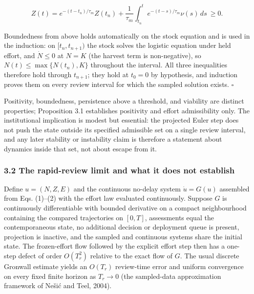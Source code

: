 \documentclass[11pt]{article}
\begin{document}
\[
Z(t)=e^{-(t-t_n)/\tau_m}Z(t_n)+\frac{1}{\tau_m}\int_{t_n}^{t}e^{-(t-s)/\tau_m}\nu(s)\,ds\ \ge 0 .
\]

Boundedness from above holds automatically on the stock equation and is used
in the induction: on \([t_n, t_{n+1})\) the stock solves the
logistic equation under held effort, and \(\dot N \le 0\) at \(N = K\)
(the harvest term is non-negative), so \(N(t) \le \max\{N(t_n), K\}\)
throughout the interval. All three inequalities therefore hold through
\(t_{n+1}\); they hold at \(t_0=0\) by hypothesis, and induction proves
them on every review interval for which the sampled solution exists. \ensuremath{\square}

Positivity, boundedness, persistence above a threshold, and viability
are distinct properties; Proposition 3.1 establishes positivity and
effort admissibility only. The institutional implication is modest but
essential: the projected Euler step does not push the state outside
its specified admissible set on a single review interval, and any later
stability or instability claim is therefore a statement about dynamics
inside that set, not about escape from it.

\subsubsection{3.2 The rapid-review limit and what it does not
establish}\label{the-rapid-review-limit-and-what-it-does-not-establish}

Define \(u=(N,Z,E)\) and the continuous no-delay system \(\dot u=G(u)\)
assembled from Eqs. (1)--(2) with the effort law evaluated continuously.
Suppose \(G\) is continuously differentiable with bounded derivative on
a compact neighbourhood containing the compared trajectories on
\([0,T]\), assessments equal the contemporaneous state, no additional
decision or deployment queue is present, projection is inactive, and the
sampled and continuous systems share the initial state. The
frozen-effort flow followed by the explicit effort step then has a
one-step defect of order \(O(T_r^2)\) relative to the exact flow of
\(G\). The usual discrete Gronwall estimate yields an \(O(T_r)\)
review-time error and uniform convergence on every fixed finite horizon
as \(T_r\to 0\) (the sampled-data approximation framework of Ne\v{s}i\'c and
Teel, 2004).
\end{document}
